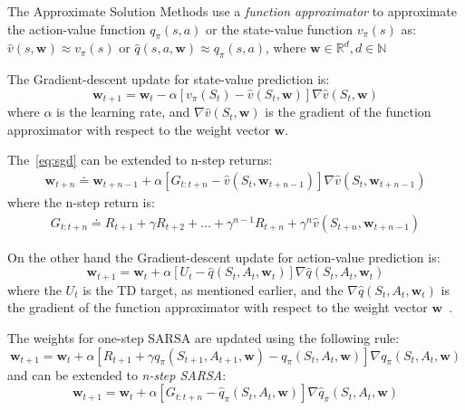\documentclass[../xlapes02]{subfiles}
\begin{document}
    The Approximate Solution Methods use a \emph{function approximator} to approximate the action-value function $q_\pi(s,a)$ or the state-value function $v_\pi(s)$ as:
    $\hat{v}(s,\bm{w})\approx v_{\pi}(s)$ or $\hat{q}(s,a,\bm{w})\approx q_{\pi}(s,a)$, where $\bm{w}\in\mathbb{R}^d,d\in\mathbb{N}$

    The Gradient-descent update for state-value prediction is:
    \begin{equation}
        \label{eq:sgd}
        \bm{w}_{t+1}=\bm{w}_t-\alpha\left[v_\pi(S_t)-\hat{v}(S_t, \bm{w})\right]\nabla \hat{v}(S_t, \bm{w})
    \end{equation}
    where $\alpha$ is the learning rate, and $\nabla \hat{v}(S_t, \bm{w})$ is the gradient of the function approximator with respect to the weight vector $\bm{w}$.

    The~\cref{eq:sgd} can be extended to n-step returns:
    \begin{equation}
        \label{eq:sgd-n-step}
        \begin{split}
            \bm{w}_{t+n}\doteq\bm{w}_{t+n-1}+\alpha\left[G_{t:t+n}-\hat{v}(S_t,\bm{w}_{t+n-1})\right]\nabla\hat{v}(S_t,\bm{w}_{t+n-1})
        \end{split}
    \end{equation}
    where the n-step return is:
    \begin{equation}
        \label{eq:n-step-return}
        \begin{split}
            G_{t:t+n}\doteq R_{t+1}+\gamma R_{t+2}+\dots+\gamma^{n-1}R_{t+n}+\gamma^n\hat{v}(S_{t+n},\bm{w}_{t+n-1})
        \end{split}
    \end{equation}

    On the other hand the Gradient-descent update for action-value prediction is:
    \begin{equation}
        \label{eq:sgd-action-value}
        \bm{w}_{t+1}=\bm{w}_t+\alpha \left[U_t-\hat{q}(S_t,A_t,\bm{w}_t)\right]\nabla \hat{q}(S_t,A_t,\bm{w}_t)
    \end{equation}
    where the $U_t$ is the TD target, as mentioned earlier, and the $\nabla \hat{q}(S_t,A_t,\bm{w}_t)$ is the gradient of the function approximator with respect to the weight vector $\bm{w}$~\cite{sutton2018reinforcement}.

    The weights for one-step SARSA are updated using the following rule:
    \begin{equation}
        \label{eq:sgd-sarsa}
        \bm{w}_{t+1}=\bm{w}_t+\alpha\left[R_{t+1}+\gamma q_{\pi}(S_{t+1},A_{t+1},\bm{w})-q_{\pi}(S_t,A_t,\bm{w})\right]\nabla q_{\pi}(S_t,A_t,\bm{w})
    \end{equation}
    and can be extended to \emph{n-step SARSA}:
    \begin{equation}
        \label{eq:sarsa-n-step}
        \bm{w}_{t+1}=\bm{w}_t+\alpha\left[G_{t:t+n}-\hat{q}_{\pi}(S_t,A_t,\bm{w})\right]\nabla\hat{q}_{\pi}(S_t,A_t,\bm{w})
    \end{equation}
\end{document}
